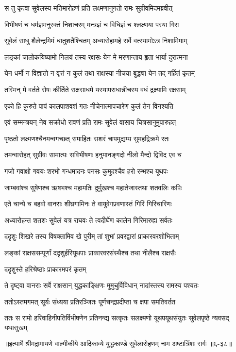 
\twolineshloka
{स तु कृत्वा सुवेलस्य मतिमारोहणं प्रति}
{लक्ष्मणानुगतो रामः सुग्रीवमिदमब्रवीत्} %

\twolineshloka
{विभीषणं च धर्मज्ञमनुरक्तं निशाचरम्}
{मन्त्रज्ञं च विधिज्ञं च श्लक्ष्णया परया गिरा} %

\twolineshloka
{सुवेलं साधु शैलेन्द्रमिमं धातुशतैश्चितम्}
{अध्यारोहामहे सर्वे वत्स्यामोऽत्र निशामिमाम्} %

\twolineshloka
{लङ्कां चालोकयिष्यामो निलयं तस्य रक्षसः}
{येन मे मरणान्ताय हृता भार्या दुरात्मना} %

\twolineshloka
{येन धर्मो न विज्ञातो न वृत्तं न कुलं तथा}
{राक्षस्या नीचया बुद्ध्या येन तद् गर्हितं कृतम्} %

\twolineshloka
{तस्मिन् मे वर्तते रोषः कीर्तिते राक्षसाधमे}
{यस्यापराधान्नीचस्य वधं द्रक्ष्यामि रक्षसाम्} %

\twolineshloka
{एको हि कुरुते पापं कालपाशवशं गतः}
{नीचेनात्मापचारेण कुलं तेन विनश्यति} %

\twolineshloka
{एवं सम्मन्त्रयन् नेव सक्रोधो रावणं प्रति}
{रामः सुवेलं वासाय चित्रसानुमुपारुहत्} %

\twolineshloka
{पृष्ठतो लक्ष्मणश्चैनमन्वगच्छत् समाहितः}
{सशरं चापमुद्यम्य सुमहद्विक्रमे रतः} %

\twolineshloka
{तमन्वारोहत् सुग्रीवः सामात्यः सविभीषणः}
{हनुमानङ्गदो नीलो मैन्दो द्विविद एव च} %

\twolineshloka
{गजो गवाक्षो गवयः शरभो गन्धमादनः}
{पनसः कुमुदश्चैव हरो रम्भश्च यूथपः} %

\twolineshloka
{जाम्बवांश्च सुषेणश्च ऋषभश्च महामतिः}
{दुर्मुखश्च महातेजास्तथा शतवलिः कपिः} %

\twolineshloka
{एते चान्ये च बहवो वानराः शीघ्रगामिनः}
{ते वायुवेगप्रवणास्तं गिरिं गिरिचारिणः} %

\twolineshloka
{अध्यारोहन्त शतशः सुवेलं यत्र राघवः}
{ते त्वदीर्घेण कालेन गिरिमारुह्य सर्वतः} %

\twolineshloka
{ददृशुः शिखरे तस्य विषक्तामिव खे पुरीम्}
{तां शुभां प्रवरद्वारां प्राकारवरशोभिताम्} %

\twolineshloka
{लङ्कां राक्षससम्पूर्णां ददृशुर्हरियूथपाः}
{प्राकारवरसंस्थैश्च तथा नीलैश्च राक्षसैः} %

\onelineshloka
{ददृशुस्ते हरिश्रेष्ठाः प्राकारमपरं कृतम्} %

\twolineshloka
{ते दृष्ट्वा वानराः सर्वे राक्षसान् युद्धकाङ्क्षिणः}
{मुमुचुर्विविधान् नादांस्तस्य रामस्य पश्यतः} %

\twolineshloka
{ततोऽस्तमगमत् सूर्यः संध्यया प्रतिरञ्जितः}
{पूर्णचन्द्रप्रदीप्ता च क्षपा समतिवर्तत} %

\twolineshloka
{ततः स रामो हरिवाहिनीपतिर्विभीषणेन प्रतिनन्द्य सत्कृतः}
{सलक्ष्मणो यूथपयूथसंयुतः सुवेलपृष्ठे न्यवसद् यथासुखम्} %


॥इत्यार्षे श्रीमद्रामायणे वाल्मीकीये आदिकाव्ये युद्धकाण्डे सुवेलारोहणम् नाम अष्टात्रिंशः सर्गः ॥६-३८॥
